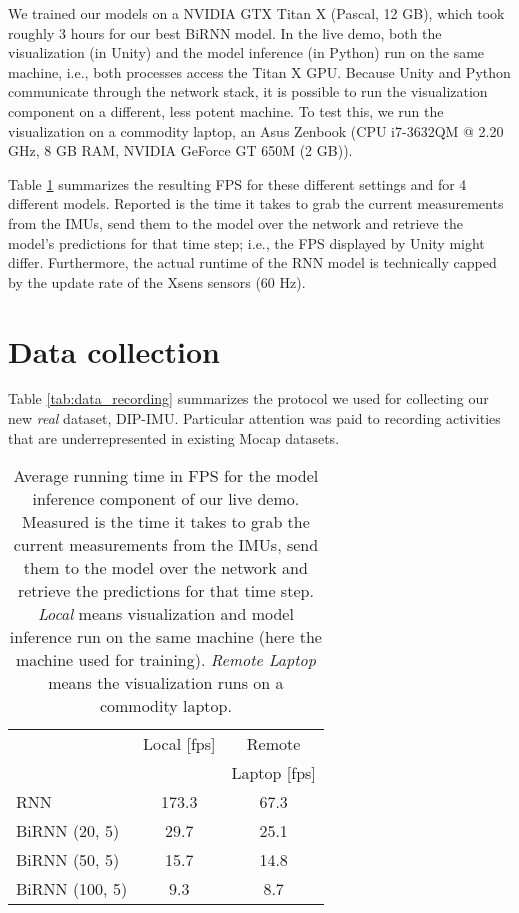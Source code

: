 \documentclass[acmtog]{acmart}
\begin{document}
We trained our models on a NVIDIA GTX Titan X (Pascal, 12 GB), which took roughly 3 hours for our best BiRNN model. In the live demo, both the visualization (in Unity) and the model inference (in Python) run on the same machine, i.e., both processes access the Titan X GPU. Because Unity and Python communicate through the  network stack, it is possible to run the visualization component on a different, less potent machine. To test this, we run the visualization on a commodity laptop, an Asus Zenbook (CPU i7-3632QM @ 2.20 GHz, 8 GB RAM, NVIDIA GeForce GT 650M (2 GB)). 

Table \ref{tab:experiment_fps} summarizes the resulting FPS for these different settings and for 4 different models. Reported is the time it takes to grab the current measurements from the IMUs, send them to the model over the network and retrieve the model's predictions for that time step; i.e., the FPS displayed by Unity might differ. Furthermore, the actual runtime of the RNN model is technically capped by the update rate of the Xsens sensors (60 Hz).

\section{Data collection}\label{app:data_collection_protocol}
Table \ref{tab:data_recording} summarizes the protocol we used for collecting our new \emph{real} dataset, DIP-IMU. Particular attention was paid to recording activities that are underrepresented in existing Mocap datasets.

\vfill\eject\begin{table}[tbh]
	\caption{Average running time in FPS for the model inference component of our live demo. Measured is the time it takes to grab the current measurements from the IMUs, send them to the model over the network and retrieve the predictions for that time step. \emph{Local} means visualization and model inference run on the same machine (here the machine used for training). \emph{Remote Laptop} means the visualization runs on a commodity laptop.}
	
	\begin{tabular}{l c c}
		\toprule
		& Local [fps] & Remote \\
        & & Laptop [fps]\\
		\hline
		RNN & 173.3  & 67.3 \\
        BiRNN (20, 5) & 29.7 & 25.1 \\
        BiRNN (50, 5) & 15.7 & 14.8 \\
        BiRNN (100, 5) & 9.3 & 8.7 \\
		\hline
	\end{tabular}
    \label{tab:experiment_fps}
	\end{table}
\end{document}
